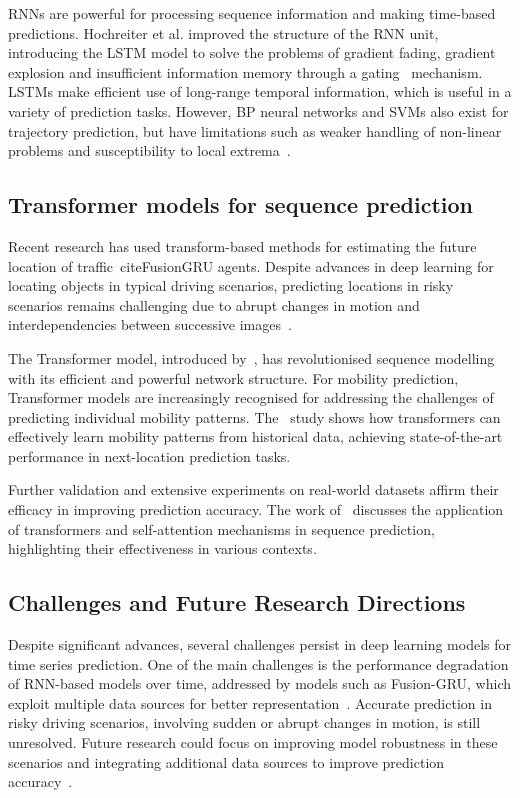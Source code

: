 \documentclass[12pt,oneside]{book} %
\begin{document}
RNNs are powerful for processing sequence information and making time-based
predictions. Hochreiter et al. improved the structure of the RNN unit,
introducing the LSTM model to solve the problems of gradient fading, gradient
explosion and insufficient information memory through a
gating~\cite{WaterShipTrajectoryPrediction} mechanism. LSTMs make efficient use
of long-range temporal information, which is useful in a variety of prediction
tasks. However, BP neural networks and SVMs also exist for trajectory
prediction, but have limitations such as weaker handling of non-linear problems
and susceptibility to local extrema~\cite{WaterShipTrajectoryPrediction}.

\subsection{Transformer models for sequence prediction}
Recent research has used transform-based methods for estimating the future
location of traffic~cite{FusionGRU} agents. Despite advances in deep learning
for locating objects in typical driving scenarios, predicting locations in
risky scenarios remains challenging due to abrupt changes in motion and
interdependencies between successive images~\cite{FusionGRU}.

The Transformer model, introduced by~\citet{Vaswani2017}, has revolutionised
sequence modelling with its efficient and powerful network structure. For
mobility prediction, Transformer models are increasingly recognised for
addressing the challenges of predicting individual mobility patterns.
The~\citet{HowDoUGoWhere} study shows how transformers can effectively learn
mobility patterns from historical data, achieving state-of-the-art performance
in next-location prediction tasks.

Further validation and extensive experiments on real-world datasets affirm
their efficacy in improving prediction accuracy. The work
of~\citet{SpatioTemporalTransformerRecommender} discusses the application of
transformers and self-attention mechanisms in sequence prediction, highlighting
their effectiveness in various contexts.

\subsection{Challenges and Future Research Directions}
Despite significant advances, several challenges persist in deep learning
models for time series prediction. One of the main challenges is the
performance degradation of RNN-based models over time, addressed by models such
as Fusion-GRU, which exploit multiple data sources for better
representation~\cite{FusionGRU}. Accurate prediction in risky driving
scenarios, involving sudden or abrupt changes in motion, is still unresolved.
Future research could focus on improving model robustness in these scenarios
and integrating additional data sources to improve prediction
accuracy~\cite{FusionGRU}.
\end{document}
